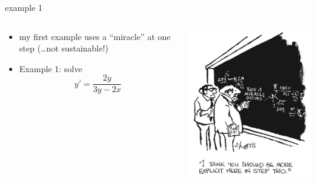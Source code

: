 \documentclass{beamer}
\begin{document}
\begin{frame}{example 1}

\begin{columns}
\begin{column}{0.65\textwidth}
\begin{itemize}
\item my first example uses a ``miracle'' at one step (\dots not sustainable!)
\item Example 1: solve
    $$y' = \frac{2y}{3y-2x}$$

\vspace{40mm}
\end{itemize}
\end{column}
\begin{column}{0.35\textwidth}
\includegraphics[width=\textwidth]{figs/miracle}

\vspace{20mm}
\end{column}
\end{columns}
\end{frame}
\end{document}
